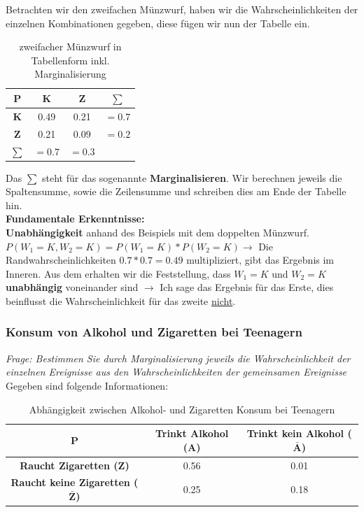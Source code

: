 \documentclass[a4paper]{article}
\theoremstyle{definition}
\theoremstyle{example}
\begin{document}
Betrachten wir den zweifachen Münzwurf, haben wir die Wahrscheinlichkeiten der einzelnen Kombinationen gegeben, diese fügen wir nun der Tabelle ein.
\begin{table}[h!]
	\begin{center}
		\caption{zweifacher Münzwurf in Tabellenform inkl. Marginalisierung}
		\label{tab: table1}
		\begin{tabular}{c|c|c|c}
			\textbf{P} & \textbf{K} & \textbf{Z} & \textbf{$\sum$}\\
			\hline
			\textbf{K} & 0.49 & 0.21 & $= 0.7$\\
			\textbf{Z} & 0.21 & 0.09 & $= 0.2$\\
			\textbf{$\sum$} & $= 0.7$ & $= 0.3$\\
		\end{tabular}
	\end{center}
\end{table}
Das $\sum$ steht für das sogenannte \textbf{Marginalisieren}. Wir berechnen jeweils die Spaltensumme, sowie die Zeilensumme und schreiben dies am Ende der Tabelle hin. \\
\textbf{Fundamentale Erkenntnisse:}\\
\textbf{Unabhängigkeit} anhand des Beispiels mit dem doppelten Münzwurf.\\

$P(W_1 = K, W_2 = K) = P(W_1 = K) * P(W_2 = K)  \rightarrow$ Die Randwahrscheinlichkeiten $0.7*0.7 = 0.49$ multipliziert, gibt das Ergebnis im Inneren. Aus dem erhalten wir die Feststellung, dass $W_1 = K$ und $W_2 = K$ \textbf{unabhängig} voneinander sind $\rightarrow$ Ich sage das Ergebnis für das Erste, dies beinflusst die Wahrscheinlichkeit für das zweite \underline{nicht}.

\subsubsection{Konsum von Alkohol und Zigaretten bei Teenagern}
\textit{Frage: Bestimmen Sie durch Marginalisierung jeweils die Wahrscheinlichkeit der einzelnen Ereignisse aus den Wahrscheinlichkeiten der gemeinsamen Ereignisse}\\
Gegeben sind folgende Informationen:\\
\begin{table}[h!]
	\begin{center}
		\caption{Abhängigkeit zwischen Alkohol- und Zigaretten Konsum bei Teenagern}
		\label{tab: table1}
		\begin{tabular}{c|c|c}
			\textbf{P} & \textbf{Trinkt Alkohol (A)} & \textbf{Trinkt kein Alkohol ($\mathbf{\bar{A}}$)}\\
			\hline
			\textbf{Raucht Zigaretten (Z)} & 0.56 & 0.01\\
			\textbf{Raucht keine Zigaretten ($\mathbf{\bar{Z}}$)} & 0.25 & 0.18
		\end{tabular}
	\end{center}
\end{table}
\end{document}
